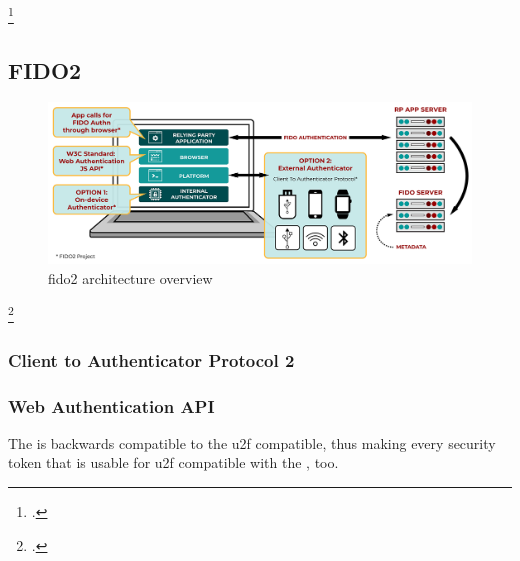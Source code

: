 \footcites[See][1--2, 4]{u2f-overview}[See][4]{u2f-js-api}

\subsection{FIDO2}

\begin{figure}[hbt]
	\centering
	\includegraphics[width=\textwidth]{pics/FIDO2-Graphic-v2}
	\caption[\gls{fido}2 architecture overview]{\gls{fido}2 architecture overview\footnotemark}
	\label{fig:fido2_architecture}
\end{figure}
\footcitetext[Source: https://fidoalliance.org/specifications/][4]{uaf-overview}


\subsubsection{Client to Authenticator Protocol 2}

\subsubsection{Web Authentication API}

The \wa{} is backwards compatible to the \gls{u2f} compatible, thus making every security token that is usable for \gls{u2f} compatible with the \wa, too.